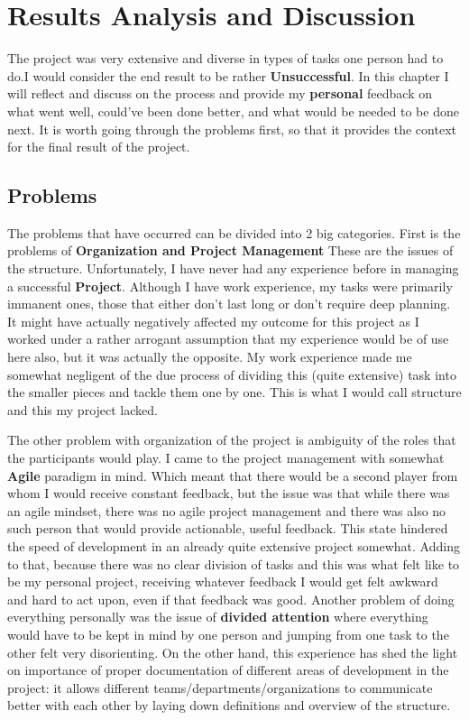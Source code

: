 \section{Results Analysis and Discussion}
The project was very extensive and diverse in types of tasks one person had to do.I would consider the end result to be rather \textbf{Unsuccessful}. In this chapter I will reflect and discuss on the process and provide my \textbf{personal} feedback on what went well, could've been done better, and what would be needed to be done next. It is worth going through the problems first, so that it provides the context for the final result of the project.
\subsection{Problems}
The problems that have occurred can be divided into 2 big categories. First is the problems of \textbf{Organization and Project Management} These are the issues of the structure. Unfortunately, I have never had any experience before in managing a successful \textbf{Project}. Although I have work experience, my tasks were primarily immanent ones, those that either don't last long or don't require deep planning. It might have actually negatively affected my outcome for this project as I worked under a rather arrogant assumption that my experience would be of use here also, but it was actually the opposite. My work experience made me somewhat negligent of the due process of dividing this (quite extensive) task into the smaller pieces and tackle them one by one. This is what I would call structure and this my project lacked. 

The other problem with organization of the project is ambiguity of the roles that the participants would play. I came to the project management with somewhat \textbf{Agile} paradigm in mind. Which meant that there would be a second player from whom I would receive constant feedback, but the issue was that while there was an agile mindset, there was no agile project management and there was also no such person that would provide actionable, useful feedback. This state hindered the speed of development in an already quite extensive project somewhat. Adding to that, because there was no clear division of tasks and this was what felt like to be my personal project, receiving whatever feedback I would get felt awkward and hard to act upon, even if that feedback was good. Another problem of doing everything personally was the issue of \textbf{divided attention} where everything would have to be kept in mind by one person and jumping from one task to the other felt very disorienting. On the other hand, this experience has shed the light on importance of proper documentation of different areas of development in the project: it allows different teams/departments/organizations to communicate better with each other by laying down definitions and overview of the structure.


